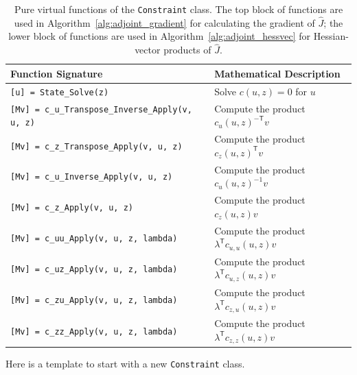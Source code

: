\documentclass{article}
\newcommand{\trp}{^{\mathsf{T}}}
\newcommand{\invtrp}{^{-\mathsf{T}}}
\begin{document}
\begin{table}[!ht]
\centering
\begin{tabular}{|l|l|}
    \hline
    Function Signature & Mathematical Description
    \\ \hline
    \texttt{[u] = State\_Solve(z)}
    & Solve $c(u, z)=0$ for $u$
    \\
    \texttt{[Mv] = c\_u\_Transpose\_Inverse\_Apply(v, u, z)}
    & Compute the product $c_u(u, z)\invtrp v$
    \\
    \texttt{[Mv] = c\_z\_Transpose\_Apply(v, u, z)}
    & Compute the product $c_z(u, z)\trp v$
    \\ \hline
    \texttt{[Mv] = c\_u\_Inverse\_Apply(v, u, z)}
    & Compute the product $c_u(u, z)^{-1} v$
    \\
    \texttt{[Mv] = c\_z\_Apply(v, u, z)}
    & Compute the product $c_z(u, z) v$
    \\
    \texttt{[Mv] = c\_uu\_Apply(v, u, z, lambda)}
    & Compute the product $\lambda\trp c_{u, u}(u, z) v$
    \\
    \texttt{[Mv] = c\_uz\_Apply(v, u, z, lambda)}
    & Compute the product $\lambda\trp c_{u, z}(u, z) v$
    \\
    \texttt{[Mv] = c\_zu\_Apply(v, u, z, lambda)}
    & Compute the product $\lambda\trp c_{z, u}(u, z)v$
    \\
    \texttt{[Mv] = c\_zz\_Apply(v, u, z, lambda)}
    & Compute the product $\lambda\trp c_{z, z}(u, z) v$
    \\ \hline
\end{tabular}
\caption{Pure virtual functions of the \texttt{Constraint} class. The top block of functions are used in Algorithm~\ref{alg:adjoint_gradient} for calculating the gradient of $\hat{J}$; the lower block of functions are used in Algorithm~\ref{alg:adjoint_hessvec} for Hessian-vector products of $\hat{J}$.}
\label{tab:constraint_virtuals}
\end{table}

Here is a template to start with a new \texttt{Constraint} class.
\end{document}
